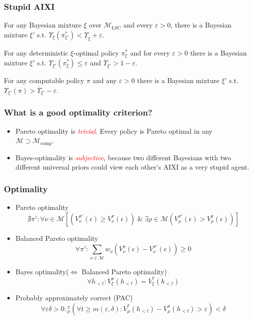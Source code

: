 \documentclass[UTF8,11pt,colorlinks,compress,openany]{beamer}%
\begin{document}
\begin{frame}\frametitle{Stupid AIXI}
\setlength\abovedisplayskip{0pt}
\setlength\belowdisplayskip{0pt}
	\begin{theorem}
		For any Bayesian mixture $\xi$ over $\mathcal{M}_{\mathrm{LSC}}$ and every $\varepsilon> 0$, there is a Bayesian mixture $\xi'$ s.t. $\Upsilon_\xi(\pi_{\xi'}^*)<\underline{\Upsilon}_\xi+\varepsilon$.
	\end{theorem}
	\begin{theorem}
		For any deterministic $\xi$-optimal policy $\pi_\xi^*$ and for every $\varepsilon> 0$ there is a Bayesian mixture $\xi'$ s.t. $\Upsilon_{\xi'}(\pi_\xi^*)\leq\varepsilon$ and $\overline{\Upsilon}_{\xi'}>1-\varepsilon$.
	\end{theorem}
	\begin{theorem}
		For any computable policy $\pi$ and any $\varepsilon> 0$ there is a Bayesian mixture $\xi'$ s.t. $\Upsilon_{\xi'}(\pi)>\overline{\Upsilon}_{\xi'}-\varepsilon$.
	\end{theorem}
\end{frame}

\begin{frame}\frametitle{What is a good optimality criterion?}
	\begin{itemize}
		\item Pareto optimality is \textcolor{red}{\emph{trivial}}. Every policy is Pareto optimal in any $\mathcal{M}\supset\mathcal{M}_{\mathrm{comp}}$.
		\item Bayes-optimality is \textcolor{red}{\emph{subjective}}, because two different Bayesians with two different universal priors could view each other's AIXI as a very stupid agent.
	\end{itemize}
\end{frame}

\begin{frame}\frametitle{Optimality}
	\begin{itemize}
		\item Pareto optimality
		\[\nexists\pi': \forall\nu\in\mathcal{M}\left[\left(V_\nu^{\pi'}(\epsilon)\geq V_\nu^\pi(\epsilon)\right)\;\&\;\exists\rho\in\mathcal{M}\left(V_\rho^{\pi'}(\epsilon) > V_\rho^\pi(\epsilon)\right)\right]\]
		\item Balanced Pareto optimality
		\[\forall\pi':\sum\limits_{\nu\in\mathcal{M}} w_\nu\left(V_\nu^\pi(\epsilon)- V_\nu^{\pi'}(\epsilon)\right)\geq 0\]
		\item Bayes optimality($\iff$ Balanced Pareto optimality)
		\[\forall h_{<t}: V_\xi^\pi(h_{<t})=V_\xi^*(h_{<t})\]
		\item Probably approximately correct (PAC)
		\[\forall \varepsilon\delta>0: {}_\mu^\pi\left(\forall t\geq m(\varepsilon,\delta): V_\mu^*(h_{<t})-V_\mu^\pi(h_{<t})> \varepsilon\right)<\delta\]
	\end{itemize}
\end{frame}
\end{document}
